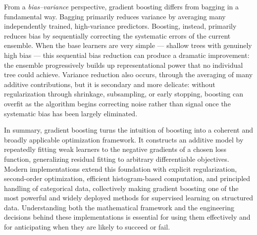 From a \emph{bias--variance} perspective, gradient boosting differs from bagging in a fundamental way. Bagging primarily reduces variance by averaging many independently trained, high-variance predictors. Boosting, instead, primarily reduces bias by sequentially correcting the systematic errors of the current ensemble. When the base learners are very simple --- shallow trees with genuinely high bias --- this sequential bias reduction can produce a dramatic improvement: the ensemble progressively builds up representational power that no individual tree could achieve. Variance reduction also occurs, through the averaging of many additive contributions, but it is secondary and more delicate: without regularization through shrinkage, subsampling, or early stopping, boosting can overfit as the algorithm begins correcting noise rather than signal once the systematic bias has been largely eliminated.

\medskip
In summary, gradient boosting turns the intuition of boosting into a coherent and broadly applicable optimization framework. It constructs an additive model by repeatedly fitting weak learners to the negative gradients of a chosen loss function, generalizing residual fitting to arbitrary differentiable objectives. Modern implementations extend this foundation with explicit regularization, second-order optimization, efficient histogram-based computation, and principled handling of categorical data, collectively making gradient boosting one of the most powerful and widely deployed methods for supervised learning on structured data. Understanding both the mathematical framework and the engineering decisions behind these implementations is essential for using them effectively and for anticipating when they are likely to succeed or fail.

%